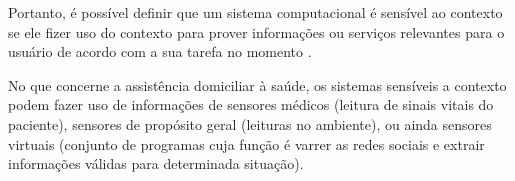 Portanto, é possível definir que um sistema computacional é sensível ao contexto
se ele fizer uso do contexto para prover informações ou serviços relevantes para
o usuário de acordo com a sua tarefa no momento \cite{dey2001understanding}.

No que concerne a assistência domiciliar à saúde, os sistemas sensíveis a
contexto podem fazer uso de informações de sensores médicos (leitura de sinais 
vitais do paciente), sensores de propósito geral (leituras no ambiente), 
ou ainda sensores virtuais (conjunto de programas cuja função é varrer as redes 
sociais e extrair informações válidas para determinada situação).



























